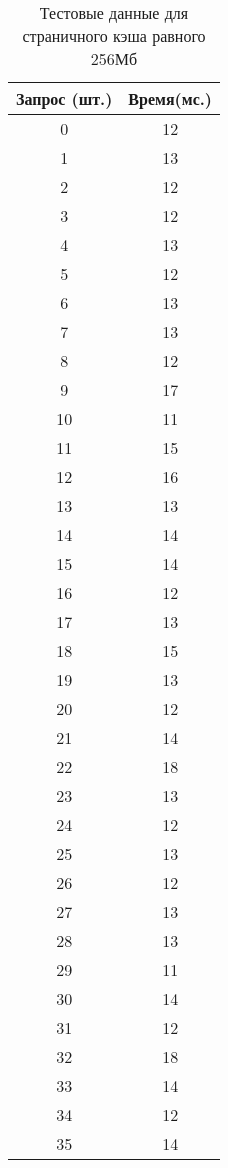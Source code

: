 \begin{table}[H]
	\begin{minipage}{.4\textwidth}
		\centering
		\caption{Тестовые данные для страничного кэша равного 256Мб}
		\begin{tabular}{|c|c|}
			\hline
			Запрос (шт.) & Время(мс.) \\
			\hline
			0   & 12 \\
			1   & 13 \\
			2   & 12 \\
			3   & 12 \\
			4   & 13 \\
			5   & 12 \\
			6   & 13 \\
			7   & 13 \\
			8   & 12 \\
			9   & 17 \\
			10  & 11 \\
			11  & 15 \\
			12  & 16 \\
			13  & 13 \\
			14  & 14 \\
			15  & 14 \\
			16  & 12 \\
			17  & 13 \\
			18  & 15 \\
			19  & 13 \\
			20  & 12 \\
			21  & 14 \\
			22  & 18 \\
			23  & 13 \\
			24  & 12 \\
			25  & 13 \\
			26  & 12 \\
			27  & 13 \\
			28  & 13 \\
			29  & 11 \\
			30  & 14 \\
			31  & 12 \\
			32  & 18 \\
			33  & 14 \\
			34  & 12 \\
			35  & 14 \\
			\hline
		\end{tabular}
	\end{minipage}
	\hfill
	\begin{minipage}{.4\textwidth}
		\centering
		\caption{Тестовые данные для страничного кэша равного 256Мб}

\end{minipage}
\end{table}
